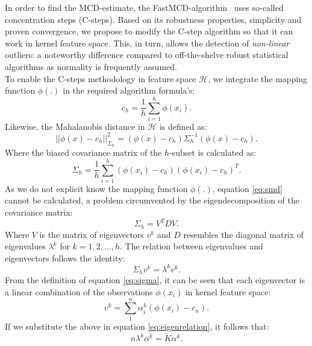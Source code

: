 \documentclass[preprint,12pt]{elsarticle}
\begin{document}
	In order to find the MCD-estimate, the FastMCD-algorithm~\cite{rousseeuw1999fast} uses so-called concentration steps (C-steps). Based on its robustness properties, simplicity and proven convergence, we propose to modify the C-step algorithm so that it can work in kernel feature space. This, in turn, allows the detection of \textit{non-linear} outliers: a noteworthy difference compared to off-the-shelve robust statistical algorithms as normality is frequently assumed. \\
	
	To enable the C-steps methodology in feature space $\mathcal{H}$, we integrate the mapping function $\phi(.)$ in the required algorithm formula's: 
	\begin{equation}
	\label{eq:center}
	c_h = \frac{1}{h} \sum_{i=1}^{h}\phi(x_i).
	\end{equation}
	Likewise, the Mahalanobis distance in $\mathcal{H}$ is defined as:
	\begin{equation}
	\label{eq:smd}
	||\phi(x) - c_h||^2_{\Sigma_h} = (\phi(x) - c_h) \Sigma^{-1}_h (\phi(x) - c_h).
	\end{equation}
	Where the biased covariance matrix of the $h$-subset is calculated as:
	\begin{equation}
	\Sigma_h = \frac{1}{h} \sum_{i=1}^{h} (\phi(x_i) - c_h) (\phi(x_i) - c_h)^T.
	\label{eq:sigma}
	\end{equation}
	As we do not explicit know the mapping function $\phi(.)$, equation \eqref{eq:smd} cannot be calculated, a problem circumvented by the eigendecomposition of the covariance matrix:
	\begin{equation}
	\Sigma_h = V^T D V.
	\end{equation}
	Where $V$ is the matrix of eigenvectors $v^k$ and $D$ resembles the diagonal matrix of eigenvalues $\lambda^k$ for $k=1,2, \dots, h$. The relation between eigenvalues and eigenvectors follows the identity:
	\begin{equation}
	\label{eq:eigenrelation}
	\Sigma_h v^k = \lambda^k v^k.
	\end{equation} 
	From the definition of equation \eqref{eq:sigma}, it can be seen that each eigenvector is a linear combination of the observations $\phi(x_i)$ in kernel feature space:
	\begin{equation}
	v^k = \sum_{1}^{n} \alpha_i^k ( \phi(x_i) - c_n). 
	\end{equation}
	If we substitute the above in equation \eqref{eq:eigenrelation}, it follows that:
	\begin{equation}
	n \lambda^k \alpha^k = \tilde{K} \alpha^k.
	\end{equation}
\end{document}
